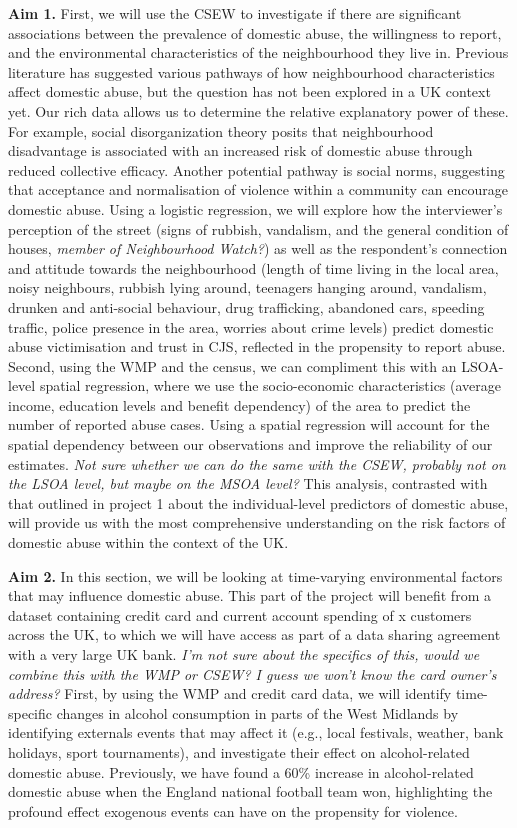 \documentclass[11pt, a4paper]{article}
\begin{document}
\textbf{Aim 1.} First, we will use the CSEW to investigate if there are significant associations between the prevalence of domestic abuse, the willingness to report, and the environmental characteristics of the neighbourhood they live in. Previous literature has suggested various pathways of how neighbourhood characteristics affect domestic abuse, but the question has not been explored in a UK context yet. Our rich data allows us to determine the relative explanatory power of these. For example, social disorganization theory posits that neighbourhood disadvantage is associated with an increased risk of domestic abuse through reduced collective efficacy. Another potential pathway is social norms, suggesting that acceptance and normalisation of violence within a community can encourage domestic abuse. Using a logistic regression, we will explore how the interviewer's perception of the street (signs of rubbish, vandalism, and the general condition of houses, \textit{member of Neighbourhood Watch?}) as well as the respondent's connection and attitude towards the neighbourhood (length of time living in the local area, noisy neighbours, rubbish lying around, teenagers hanging around, vandalism, drunken and anti-social behaviour, drug trafficking, abandoned cars, speeding traffic, police presence in the area, worries about crime levels) predict domestic abuse victimisation and trust in CJS, reflected in the propensity to report abuse. Second, using the WMP and the census, we can compliment this with an LSOA-level spatial regression, where we use the socio-economic characteristics (average income, education levels and benefit dependency) of the area to predict the number of reported abuse cases. Using a spatial regression will account for the spatial dependency between our observations and improve the reliability of our estimates. \textit{Not sure whether we can do the same with the CSEW, probably not on the LSOA level, but maybe on the MSOA level?} This analysis, contrasted with that outlined in project 1 about the individual-level predictors of domestic abuse, will provide us with the most comprehensive understanding on the risk factors of domestic abuse within the context of the UK.

\textbf{Aim 2.} In this section, we will be looking at time-varying environmental factors that may influence domestic abuse. This part of the project will benefit from a dataset containing credit card and current account spending of x customers across the UK, to which we will have access as part of a data sharing agreement with a very large UK bank. \textit{I'm not sure about the specifics of this, would we combine this with the WMP or CSEW? I guess we won't know the card owner's address?} First, by using the WMP and credit card data, we will identify time-specific changes in alcohol consumption in parts of the West Midlands by identifying externals events that may affect it (e.g., local festivals, weather, bank holidays, sport tournaments), and investigate their effect on alcohol-related domestic abuse. Previously, we have found a 60\% increase in alcohol-related domestic abuse when the England national football team won, highlighting the profound effect exogenous events can have on the propensity for violence. 
\end{document}
